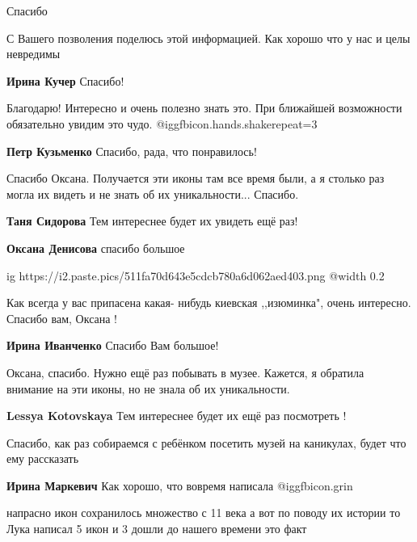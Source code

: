 \begin{itemize}
Спасибо

С Вашего позволения поделюсь этой информацией. Как хорошо что у нас и целы невредимы

\textbf{Ирина Кучер} Спасибо!


Благодарю! Интересно и очень полезно знать это. При ближайшей возможности
обязательно увидим это чудо. @igg{fbicon.hands.shake}{repeat=3} 

\textbf{Петр Кузьменко} Спасибо, рада, что понравилось!


Спасибо Оксана. Получается эти иконы там все время были, а я столько раз могла их
видеть и не знать об их уникальности... Спасибо.

\begin{itemize} %
\textbf{Таня Сидорова} Тем интереснее будет их увидеть ещё раз!

\textbf{Оксана Денисова} спасибо большое
\end{itemize} %


\ifcmt
  ig https://i2.paste.pics/511fa70d643e5cdcb780a6d062aed403.png
  @width 0.2
\fi

Как всегда у вас припасена какая- нибудь киевская ,,изюминка", очень интересно.
Спасибо вам, Оксана !


\textbf{Ирина Иванченко} Спасибо Вам большое!

Оксана, спасибо.
Нужно ещё раз побывать в музее.
Кажется, я обратила внимание на эти иконы, но не знала об их уникальности.

\textbf{Lessya Kotovskaya} Тем интереснее будет их ещё раз посмотреть !


Спасибо, как раз собираемся с ребёнком посетить музей на каникулах, будет что
ему рассказать

\textbf{Ирина Маркевич} Как хорошо, что вовремя написала @igg{fbicon.grin} 


напрасно икон сохранилось множество с 11 века а вот по поводу их истории то
Лука написал 5 икон и 3 дошли до нашего времени это факт


\end{itemize}
